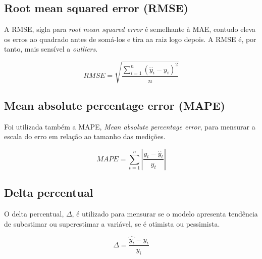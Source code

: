 \subsection{Root mean squared error (RMSE)}

    A RMSE, sigla para \textit{root mean squared  error} é
    semelhante à MAE, contudo eleva os erros ao quadrado antes de 
    somá-los e tira aa raiz logo depois. A RMSE é, por tanto, 
    mais sensível a \textit{outliers}.\cite{forecast-evaluation-ds}

    \begin{equation}
        RMSE = \sqrt{\frac{\sum_{i=1}^n (\hat{y}_i - y_i)^2}{n}}
    \end{equation}

\subsection{Mean absolute percentage error (MAPE)}

    Foi utilizada também a MAPE, \textit{Mean absolute
    percentage error}, para mensurar a escala do erro em 
    relação ao tamanho das medições.

    \begin{equation}
        MAPE=\sum_{t=1}^n\left|\frac{y_t-\hat{y}_t}{y_t}\right|
    \end{equation}

\subsection{Delta percentual}

O delta percentual, $\Delta$, é utilizado para mensurar se o 
modelo apresenta tendência de subestimar ou superestimar a variável, se 
é otimista ou pessimista.

\begin{equation}
    \Delta = \frac{\hat{y_i} - y_i}{y_i}
\end{equation}